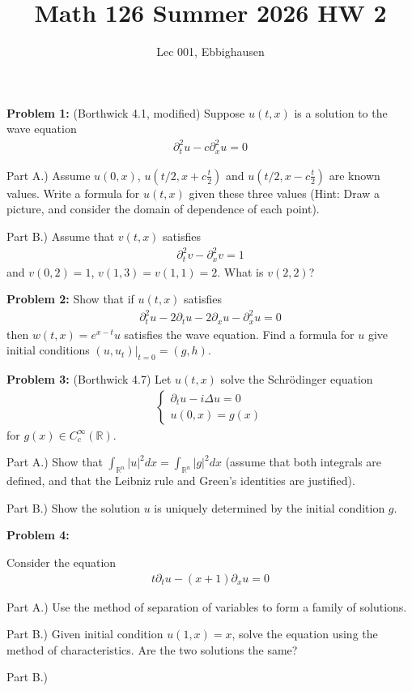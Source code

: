 \documentclass{article}
\title{Math 126 Summer 2026 HW 2}
\author{Lec 001, Ebbighausen}
\newcommand{\R}{{\mathbb{R}}}
\newcommand{\pd}{\partial}
\begin{document}
	\pagestyle{fancy}
	\fancyfoot{} 
	
	\maketitle
	
	\textbf{Problem 1:} (Borthwick 4.1, modified) Suppose $u(t,x)$ is a solution to the wave equation 
	\begin{align*}
		\pd_{t}^{2}u - c\pd_{x}^{2}u = 0
	\end{align*}
	
	Part A.) Assume $u(0,x)$, $u(t/2,x+ c\frac{t}{2})$ and $u(t/2, x - c\frac{t}{2})$ are known values. Write a formula for $u(t,x)$ given these three values (Hint: Draw a picture, and consider the domain of dependence of each point). 
	
	Part B.) Assume that $v(t,x)$ satisfies 
	\begin{align*}
		\pd_{t}^{2}v - \pd_{x}^{2}v = 1
	\end{align*}
	and $v(0,2) = 1$, $v(1,3) = v(1,1) = 2$. What is $v(2,2)$?
	
	\textbf{Problem 2:} Show that if $u(t,x)$ satisfies 
	\begin{align*}
		\pd_{t}^{2}u - 2\pd_{t}u - 2 \pd_{x} u - \pd_{x}^{2} u =0
	\end{align*}
	then $w(t,x) = e^{x-t}u$ satisfies the wave equation. Find a formula for $u$ give initial conditions $(u,u_{t})|_{t=0} = (g,h)$. 
	
	
	\textbf{Problem 3:} (Borthwick 4.7) Let $u(t,x)$ solve the Schr{\"o}dinger equation 
	\begin{align*}
		\begin{cases}
			\pd_{t} u - i \Delta u = 0 \\
			u(0,x) = g(x)
		\end{cases}
	\end{align*}
	for $g(x) \in C_{c}^{\infty}(\R)$. 
	
	Part A.) Show that $\int_{\R^{n}} |u|^{2} dx = \int_{\R^{n}} |g|^{2} dx$ (assume that both integrals are defined, and that the Leibniz rule and Green's identities are justified).
	
	Part B.) Show the solution $u$ is uniquely determined by the initial condition $g$. 
	
	
	\textbf{Problem 4:}
	
	Consider the equation 
	\begin{align*}
		t \pd_{t} u - (x+1) \pd_{x} u = 0
	\end{align*}
	
	Part A.) Use the method of separation of variables to form a family of solutions.
	
	Part B.) Given initial condition $u(1,x) = x$, solve the equation using the method of characteristics. Are the two solutions the same?
	
	
	Part B.) 
\end{document}
